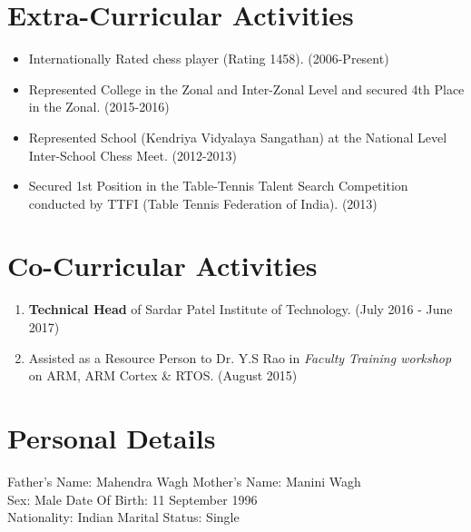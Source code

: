 \documentclass[10pt,a4paper,sans]{moderncv} %
\begin{document}
\section{Extra-Curricular Activities}

\begin{itemize}
\item Internationally Rated chess player (Rating 1458).    (2006-Present) 
\item Represented College in the Zonal and Inter-Zonal Level and secured 4th Place in the Zonal.         (2015-2016) 
\item Represented School (Kendriya Vidyalaya Sangathan) at the National Level Inter-School Chess Meet.                                   (2012-2013)  
\item Secured 1st Position in the Table-Tennis Talent Search Competition conducted by TTFI (Table Tennis Federation of India).                      (2013) 
\end {itemize}




\section{Co-Curricular Activities}
\begin{enumerate}
\item \textbf{Technical Head} of Sardar Patel Institute of Technology.                           (July 2016 - June 2017) 
\item Assisted as a Resource Person to Dr. Y.S Rao in \textit{Faculty Training workshop} on ARM, ARM Cortex \& RTOS.    (August 2015)  

\end{enumerate}




\section{Personal Details}
Father's Name: Mahendra Wagh 	\hspace{3cm}		Mother's Name: Manini Wagh \\
Sex: Male 				\hspace{6.35cm}		Date Of Birth: 11 September 1996 \\
Nationality: Indian			\hspace{5.08cm}		Marital Status: Single
\end{document}
